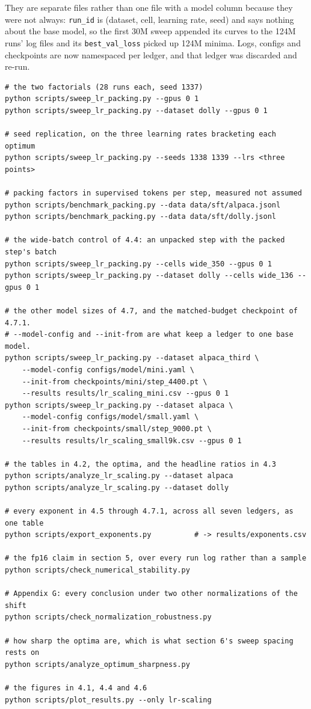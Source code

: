 \documentclass[11pt]{article}
\begin{document}
They are separate files rather than one file with a model column because they were not always: \texttt{run\_\allowbreak{}id} is (dataset, cell, learning rate, seed) and says nothing about the base model, so the first 30M sweep appended its curves to the 124M runs' log files and its \texttt{best\_\allowbreak{}val\_\allowbreak{}loss} picked up 124M minima. Logs, configs and checkpoints are now namespaced per ledger, and that ledger was discarded and re-run.

\begingroup\small
\begin{verbatim}
# the two factorials (28 runs each, seed 1337)
python scripts/sweep_lr_packing.py --gpus 0 1
python scripts/sweep_lr_packing.py --dataset dolly --gpus 0 1

# seed replication, on the three learning rates bracketing each optimum
python scripts/sweep_lr_packing.py --seeds 1338 1339 --lrs <three points>

# packing factors in supervised tokens per step, measured not assumed
python scripts/benchmark_packing.py --data data/sft/alpaca.jsonl
python scripts/benchmark_packing.py --data data/sft/dolly.jsonl

# the wide-batch control of 4.4: an unpacked step with the packed step's batch
python scripts/sweep_lr_packing.py --cells wide_350 --gpus 0 1
python scripts/sweep_lr_packing.py --dataset dolly --cells wide_136 --gpus 0 1

# the other model sizes of 4.7, and the matched-budget checkpoint of 4.7.1.
# --model-config and --init-from are what keep a ledger to one base model.
python scripts/sweep_lr_packing.py --dataset alpaca_third \
    --model-config configs/model/mini.yaml \
    --init-from checkpoints/mini/step_4400.pt \
    --results results/lr_scaling_mini.csv --gpus 0 1
python scripts/sweep_lr_packing.py --dataset alpaca \
    --model-config configs/model/small.yaml \
    --init-from checkpoints/small/step_9000.pt \
    --results results/lr_scaling_small9k.csv --gpus 0 1

# the tables in 4.2, the optima, and the headline ratios in 4.3
python scripts/analyze_lr_scaling.py --dataset alpaca
python scripts/analyze_lr_scaling.py --dataset dolly

# every exponent in 4.5 through 4.7.1, across all seven ledgers, as one table
python scripts/export_exponents.py          # -> results/exponents.csv

# the fp16 claim in section 5, over every run log rather than a sample
python scripts/check_numerical_stability.py

# Appendix G: every conclusion under two other normalizations of the shift
python scripts/check_normalization_robustness.py

# how sharp the optima are, which is what section 6's sweep spacing rests on
python scripts/analyze_optimum_sharpness.py

# the figures in 4.1, 4.4 and 4.6
python scripts/plot_results.py --only lr-scaling
\end{verbatim}
\endgroup
\end{document}
